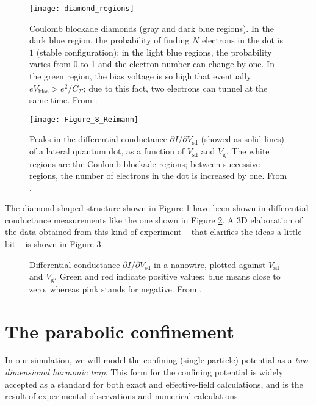 \begin{figure}[h]%
	\centering
	\texttt{[image: diamond\_regions]}
	\caption{Coulomb blockade diamonds (gray and dark blue regions). In the dark blue region, the probability of finding $N$ electrons in the dot is $1$ (stable configuration); in the light blue regions, the probability varies from 0 to 1 and the electron number can change by one. In the green region, the bias voltage is so high that eventually $eV_{\text{bias}} > e^2/C_{\Sigma}$; due to this fact, two electrons can tunnel at the same time. From \cite{Fasth2007}.}
	\label{fig:diamond_regions}
\end{figure}

\begin{figure}[H]
	\centering
	\texttt{[image: Figure\_8\_Reimann]}
	\caption{Peaks in the differential conductance $\partial I/\partial V_{\text{sd}}$ (showed as solid lines) of a lateral quantum dot, as a function of $V_{\text{sd}}$ and $V_{\text{g}}$. The white regions are the Coulomb blockade regions; between successive regions, the number of electrons in the dot is increased by one. From \cite{Reimann2002}.}
	\label{fig:Figure_8_Reimann}
\end{figure}

The diamond-shaped structure shown in Figure \ref{fig:diamond_regions} have been shown in differential conductance measurements like the one shown in Figure \ref{fig:Figure_8_Reimann}. A 3D elaboration of the data obtained from this kind of experiment -- that clarifies the ideas a little bit -- is shown in Figure \ref{fig:diff_conductance_3D}.

\begin{figure}[h]%
	\centering
	\def\svgwidth{0.8\textwidth}
	
	\caption{Differential conductance $\partial I/\partial V_{\text{sd}}$ in a nanowire, plotted against $V_{\text{sd}}$ and $V_{\text{g}}$. Green and red indicate positive values; blue means close to zero, whereas pink stands for negative. From \cite{Weinmann1994}.}
	\label{fig:diff_conductance_3D}
\end{figure}

\section{The parabolic confinement}
In our simulation, we will model the confining (single-particle) potential as a \emph{two-dimensional harmonic trap}. This form for the confining potential is widely accepted as a standard for both exact and effective-field calculations, and is the result of experimental observations and numerical calculations.

